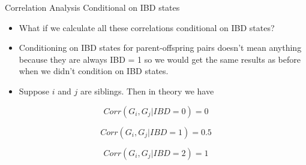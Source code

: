 \documentclass{beamer}
\begin{document}
\begin{frame}{Correlation Analysis Conditional on IBD states}
    

\begin{itemize}
    \item What if we calculate all these correlations conditional on IBD states?
    \item Conditioning on IBD states for parent-offspring pairs doesn't mean anything because they are always IBD = 1 so we would get the same results as before when we didn't condition on IBD states.
    \item Suppose \(i\) and \(j\) are siblings. Then in theory we have

\end{itemize}


\[
      Corr(G_i, G_j | IBD = 0) = 0
\]


\[
      Corr(G_i, G_j | IBD = 1) = 0.5
\]



\[
      Corr(G_i, G_j | IBD = 2) = 1
\]


\end{frame}






      







      
\end{document}
